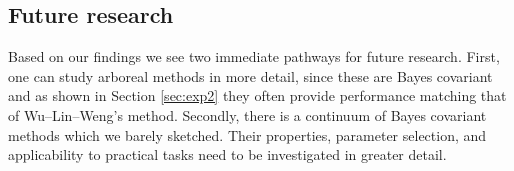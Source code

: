 \documentclass[pdflatex, sn-basic]{sn-jnl}%
\theoremstyle{thmstyleone}%
\theoremstyle{thmstyletwo}%
\theoremstyle{thmstylethree}%
\begin{document}
\subsection{Future research}

Based on our findings we see two immediate pathways for future research. 
First, one can study arboreal methods in more detail, since these are Bayes covariant 
and as shown in Section \ref{sec:exp2} they often provide performance matching 
that of Wu--Lin--Weng's method. Secondly, there is a continuum of Bayes covariant 
methods which we barely sketched. Their properties, parameter selection,  
and applicability to practical tasks need to be investigated in greater detail.



%
%
%
%
%











\backmatter


\end{document}
